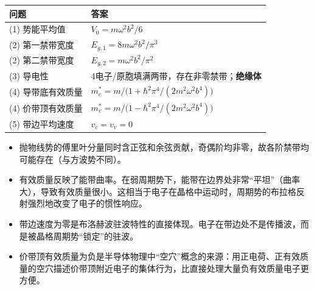 \begin{formulabox}[答案汇总]
\begin{center}
\begin{tabular}{ll}
\toprule
\textbf{问题} & \textbf{答案} \\
\midrule
(1) 势能平均值 & $V_0=m\omega^2b^2/6$ \\
(2) 第一禁带宽度 & $E_{g,1}=8m\omega^2b^2/\pi^3$ \\
(2) 第二禁带宽度 & $E_{g,2}=m\omega^2b^2/\pi^2$ \\
(3) 导电性 & 4电子/原胞填满两带，存在非零禁带；\textbf{绝缘体} \\
(4) 导带底有效质量 & $m_c^*=m\bigl/\bigl(1+\hbar^2\pi^4/(2m^2\omega^2b^4)\bigr)$ \\
(4) 价带顶有效质量 & $m_v^*=m\bigl/\bigl(1-\hbar^2\pi^4/(2m^2\omega^2b^4)\bigr)$ \\
(5) 带边平均速度 & $v_c=v_v=0$ \\
\bottomrule
\end{tabular}
\end{center}
\end{formulabox}

\begin{insightbox}[物理图像]
\begin{itemize}
    \item 抛物线势的傅里叶分量同时含正弦和余弦贡献，奇偶阶均非零，故各阶禁带均可能存在（与方波势不同）。
    \item 有效质量反映了能带曲率。在弱周期势下，能带在边界处非常``平坦''（曲率大），导致有效质量很小。这相当于电子在晶格中运动时，周期势的布拉格反射强烈地改变了电子的惯性响应。
    \item 带边速度为零是布洛赫波驻波特性的直接体现。电子在带边处不是传播波，而是被晶格周期势``锁定''的驻波。
    \item 价带顶有效质量为负是半导体物理中``空穴''概念的来源：用正电荷、正有效质量的空穴描述价带顶附近电子的集体行为，比直接处理大量负有效质量电子更方便。
\end{itemize}
\end{insightbox}
